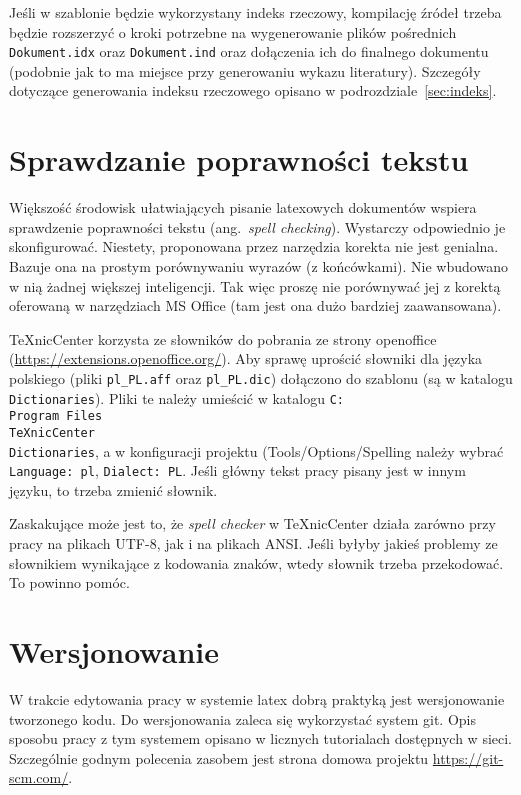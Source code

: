 Jeśli w szablonie będzie wykorzystany indeks rzeczowy, kompilację źródeł trzeba będzie rozszerzyć o kroki potrzebne na wygenerowanie plików pośrednich \texttt{Dokument.idx} oraz \texttt{Dokument.ind} oraz dołączenia ich do finalnego dokumentu (podobnie jak to ma miejsce przy generowaniu wykazu literatury).
Szczegóły dotyczące generowania indeksu rzeczowego opisano w podrozdziale~\ref{sec:indeks}.

\section{Sprawdzanie poprawności tekstu}
Większość środowisk ułatwiających pisanie latexowych dokumentów wspiera sprawdzenie poprawności tekstu (ang.~\emph{spell checking}). Wystarczy odpowiednio je skonfigurować. Niestety, proponowana przez narzędzia korekta nie jest genialna. Bazuje ona na prostym porównywaniu wyrazów (z końcówkami). Nie wbudowano w nią żadnej większej inteligencji. Tak więc proszę nie porównywać jej z korektą oferowaną w narzędziach MS Office (tam jest ona dużo bardziej zaawansowana).

TeXnicCenter korzysta ze słowników do pobrania ze strony openoffice (\url{https://extensions.openoffice.org/}).
Aby sprawę uprościć słowniki dla języka polskiego (pliki \texttt{pl\_PL.aff} oraz \texttt{pl\_PL.dic}) dołączono do szablonu (są w katalogu \texttt{Dictionaries}). Pliki te należy umieścić w katalogu \texttt{C:\\Program Files\\TeXnicCenter\\Dictionaries}, a w konfiguracji projektu (Tools/Options/Spelling należy wybrać \texttt{Language: pl}, \texttt{Dialect: PL}. Jeśli główny tekst pracy pisany jest w innym języku, to trzeba zmienić słownik.

Zaskakujące może jest to, że \emph{spell checker} w TeXnicCenter działa zarówno przy pracy na plikach UTF-8, jak i na plikach ANSI. Jeśli byłyby jakieś problemy ze słownikiem wynikające z kodowania znaków, wtedy słownik trzeba przekodować. To powinno pomóc.

\section{Wersjonowanie}
W trakcie edytowania pracy w systemie latex dobrą praktyką jest wersjonowanie tworzonego kodu. 
Do wersjonowania zaleca się wykorzystać system git. Opis sposobu pracy z tym systemem opisano w licznych tutorialach dostępnych w sieci. Szczególnie godnym polecenia zasobem jest strona domowa projektu \url{https://git-scm.com/}.

